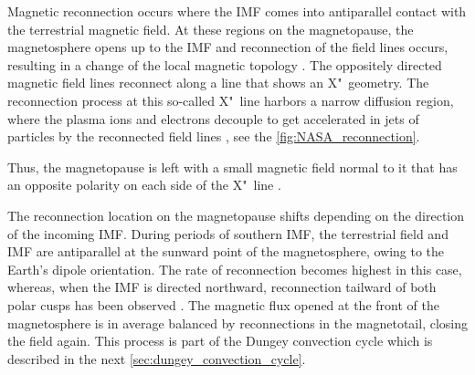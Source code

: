 Magnetic reconnection occurs where the IMF comes into antiparallel contact with the terrestrial magnetic field. At these regions on the magnetopause, the magnetosphere opens up to the IMF and reconnection of the field lines occurs, resulting in a change of the local magnetic topology \citep{Phan2005}. The oppositely directed magnetic field lines reconnect along a line that shows an X"~geometry. The reconnection process at this so-called X"~line harbors a narrow diffusion region, where the plasma ions and electrons decouple to get accelerated in jets of particles by the reconnected field lines \citep{Phan2005}, see the \autoref{fig:NASA_reconnection}.
\begin{figure}[htb]
\end{figure}
Thus, the magnetopause is left with a small magnetic field normal to it that has an opposite polarity on each side of the X"~line \citep{DeKeyser2005}.

The reconnection location on the magnetopause shifts depending on the direction of the incoming IMF. During periods of southern IMF, the terrestrial field and IMF are antiparallel at the sunward point of the magnetosphere, owing to the Earth's dipole orientation. The rate of reconnection becomes highest in this case, whereas, when the IMF is directed northward, reconnection tailward of both polar cusps has been observed \citep{Phan2005}. The magnetic flux opened at the front of the magnetosphere is in average balanced by reconnections in the magnetotail, closing the field again. This process is part of the Dungey convection cycle which is described in the next \autoref{sec:dungey_convection_cycle}.

